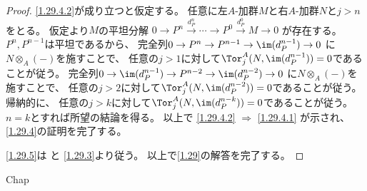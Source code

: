 \documentclass[uplatex,dvipdfmx]{jsarticle}
\begin{document}
\begin{proof}
  \ref{1.29.4.2}が成り立つと仮定する。
  任意に左\(A\)-加群\(M\)と右\(A\)-加群\(N\)と\(j>n\)をとる。
  仮定より\(M\)の平坦分解
  \(0 \to P^n \xrightarrow{d_P^n} \cdots \to P^0 \xrightarrow{d_P^0} M\to 0\)
  が存在する。
  \(P^n,P^{n-1}\)は平坦であるから、
  完全列\(0\to P^n \to P^{n-1} \to \im(d_P^{n-1})\to 0\)
  に\(N\otimes_A(-)\)を施すことで、
  任意の\(j>1\)に対して\(\Tor_j^A(N,\im(d_P^{n-1}))=0\)であることが従う。
  完全列\(0\to \im(d_P^{n-1})\to P^{n-2}\to \im(d_P^{n-2}) \to 0\)
  に\(N\otimes_A(-)\)を施すことで、
  任意の\(j>2\)に対して\(\Tor_j^A(N,\im(d_P^{n-2}))=0\)であることが従う。
  帰納的に、
  任意の\(j>k\)に対して\(\Tor_j^A(N,\im(d_P^{n-k}))=0\)であることが従う。
  \(n=k\)とすれば所望の結論を得る。
  以上で
  \ref{1.29.4.2} \(\Rightarrow\) \ref{1.29.4.1}
  が示され、\ref{1.29.4}の証明を完了する。

  \ref{1.29.5}は
  と
  \ref{1.29.3}より従う。
  以上で\autoref{1.29}の解答を完了する。
\end{proof}


\ifcsname Chap\endcsname\else
\printbibliography
\end{document}
